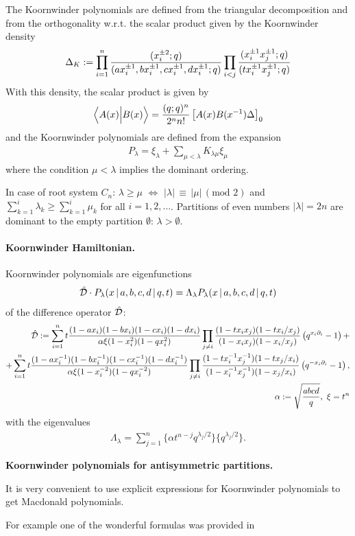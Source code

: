 \documentclass{article}
\def\be{\begin{eqnarray}}
\def\ee{\end{eqnarray}}
\def\nn{\nonumber}
\def\be{\begin{eqnarray}}
\def\ee{\end{eqnarray}}
\def\nn{\nonumber}
\def\p{\partial}
\begin{document}
The Koornwinder polynomials are defined from the triangular decomposition and from the orthogonality w.r.t. the scalar product given by the Koornwinder density
\be
\Delta_K:=\prod_{i=1}^n{(x_i^{\pm 2};q)\over (ax_i^{\pm 1},bx_i^{\pm 1},cx_i^{\pm 1},dx_i^{\pm 1};q)}
\prod_{i<j}{(x_i^{\pm 1}x_j^{\pm 1};q)\over(tx_i^{\pm 1}x_j^{\pm 1};q)}
\ee
With this density, the scalar product is given by
\be
\Big<A(x)\Big|B(x)\Big>={(q;q)^n\over 2^nn!} \left[A(x)B(x^{-1})\Delta\right]_0
\ee
and the Koornwinder polynomials are defined from the expansion
\be
P_\lambda=\xi_\lambda+\sum_{\mu<\lambda}K_{\lambda\mu}\xi_{\mu}
\ee
where the condition $\mu<\lambda$ implies the dominant ordering.

In case of root system $C_n$: $\lambda\geq \mu$ $\Longleftrightarrow$ $|\lambda|\,\equiv\, |\mu|\,(\text{mod }2)$ and $\sum_{k=1}^{i}\lambda_ k\geq \sum_{k=1}^{i}\mu_k$ for all $i=1,2, \dots$. Partitions of even numbers $|\lambda| = 2n$ are dominant to the empty partition $\emptyset$: $\lambda>\emptyset$.

\paragraph{Koornwinder Hamiltonian.}
Koornwinder polynomials are eigenfunctions
\be
\hat{\cal D}\cdot P_\lambda(x\,|\, a,b,c,d\,|\, q,t)=
\Lambda_\lambda P_\lambda(x\,|\, a,b,c,d\,|\, q,t)
\ee
of the difference operator $\hat{\cal D}$:
\be
\hat{\cal D}:=\sum_{i=1}^nt{(1-ax_i)(1-bx_i)(1-cx_i)(1-dx_i)\over \alpha\xi(1-x_i^2)(1-qx_i^2)}\prod_{j\ne i}
{(1-tx_ix_j)(1-tx_i/x_j)\over (1-x_ix_j)(1-x_i/x_j)}\left(q^{x_i\p_i}-1\right)+\nn\\
+\sum_{i=1}^nt{(1-ax_i^{-1})(1-bx_i^{-1})(1-cx_i^{-1})(1-dx_i^{-1})\over \alpha\xi(1-x_i^{-2})(1-qx_i^{-2})}\prod_{j\ne i}
{(1-tx_i^{-1}x_j^{-1})(1-tx_j/x_i)\over (1-x_i^{-1}x_j^{-1})(1-x_j/x_i)}\left(q^{-x_i\p_i}-1\right),\nn\\
\alpha:=\sqrt{abcd\over q},\,\, \xi = t^n
\ee
with the eigenvalues
\be
\Lambda_\lambda=\sum_{j=1}^n\{\alpha t^{n-j}q^{\lambda_j/2}\}\{q^{\lambda_j/2}\}.
\ee

\noindent \textbf{Koornwinder polynomials for antisymmetric partitions.}

\noindent
It is very convenient to use explicit expressions for Koornwinder polynomials to get Macdonald polynomials.

For example one of the wonderful formulas was provided in \cite{Sh2}
\end{document}
